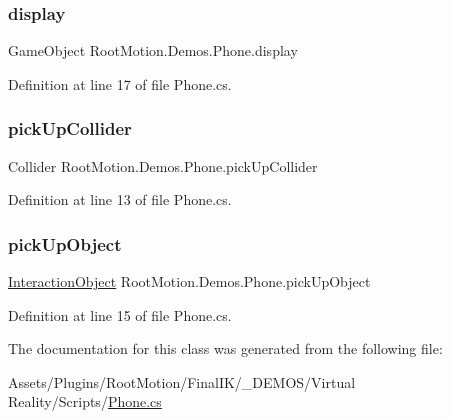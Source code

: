 \subsubsection{\texorpdfstring{display}{display}}
{\footnotesize\ttfamily Game\+Object Root\+Motion.\+Demos.\+Phone.\+display}



Definition at line 17 of file Phone.\+cs.

\mbox{\label{class_root_motion_1_1_demos_1_1_phone_a903f371941a550eaba6013b6d22f6348}} 
\subsubsection{\texorpdfstring{pick\+Up\+Collider}{pickUpCollider}}
{\footnotesize\ttfamily Collider Root\+Motion.\+Demos.\+Phone.\+pick\+Up\+Collider}



Definition at line 13 of file Phone.\+cs.

\mbox{\label{class_root_motion_1_1_demos_1_1_phone_aa5fd5026ac04f48d50d51bc8c34d1adb}} 
\subsubsection{\texorpdfstring{pick\+Up\+Object}{pickUpObject}}
{\footnotesize\ttfamily \mbox{\hyperlink{class_root_motion_1_1_final_i_k_1_1_interaction_object}{Interaction\+Object}} Root\+Motion.\+Demos.\+Phone.\+pick\+Up\+Object}



Definition at line 15 of file Phone.\+cs.



The documentation for this class was generated from the following file\+:\begin{DoxyCompactItemize}
\item 
Assets/\+Plugins/\+Root\+Motion/\+Final\+I\+K/\+\_\+\+D\+E\+M\+O\+S/\+Virtual Reality/\+Scripts/\mbox{\hyperlink{_phone_8cs}{Phone.\+cs}}\end{DoxyCompactItemize}
